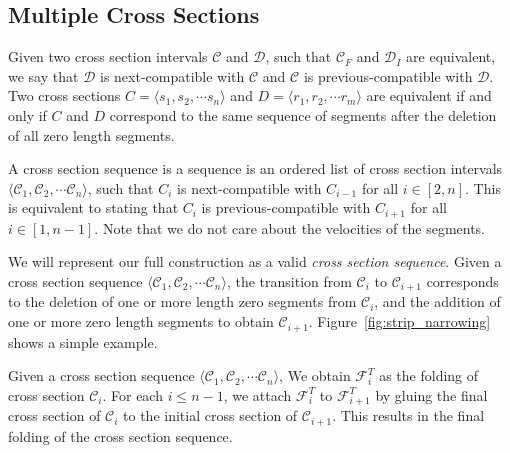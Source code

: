 \subsection{Multiple Cross Sections}
\label{sec:intervals}

\begin{definition}
\label{def:compatible}
Given two cross section intervals $\mathcal C$ and $\mathcal D$, such that $\mathcal C_F$ and $\mathcal D_I$ are equivalent,
we say that $\mathcal D$ is next-compatible with $\mathcal C$ and $\mathcal C$ is previous-compatible with $\mathcal D$.
Two cross sections $C = \langle s_1, s_2,\cdots s_n \rangle$ and $D = \langle r_1, r_2,\cdots r_m \rangle$ are equivalent
if and only if $C$ and $D$ correspond to the same sequence of segments after the deletion of all zero length segments.
\end{definition}

\begin{definition}
\label{def:cross_section_sequence}
A cross section sequence is a sequence is an ordered list of cross section intervals
$ \langle \mathcal C_1, \mathcal C_2,\cdots \mathcal C_n \rangle$,
such that $C_{i}$ is next-compatible with $C_{i-1}$ for all $i\in [2,n]$.
This is equivalent to stating that $C_{i}$ is previous-compatible with $C_{i+1}$ for all $i\in [1,n-1]$.
Note that we do not care about the velocities of the segments.
\end{definition}

We will represent our full construction as a valid \emph{cross section sequence}.
Given a cross section sequence $\langle \mathcal C_1, \mathcal C_2,\cdots \mathcal C_n \rangle$,
the transition from $\mathcal C_i$ to $\mathcal C_{i+1}$ corresponds to the deletion of one or more
length zero segments from $\mathcal C_i$, and the addition of one or more zero length segments to obtain $\mathcal C_{i+1}$.
Figure~\ref{fig:strip_narrowing} shows a simple example.


\begin{definition}
\label{def:sequence_folding}
Given a cross section sequence $\langle \mathcal C_1, \mathcal C_2,\cdots \mathcal C_n \rangle$,
We obtain $\mathcal F_i^T$ as the folding of cross section $\mathcal C_i$.
For each $i\le n-1$, we attach $\mathcal F_i^T$ to $\mathcal F_{i+1}^T$ by gluing
the final cross section of $\mathcal C_i$ to the initial cross section of $\mathcal C_{i+1}$.
This results in the final folding of the cross section sequence.
\end{definition}

